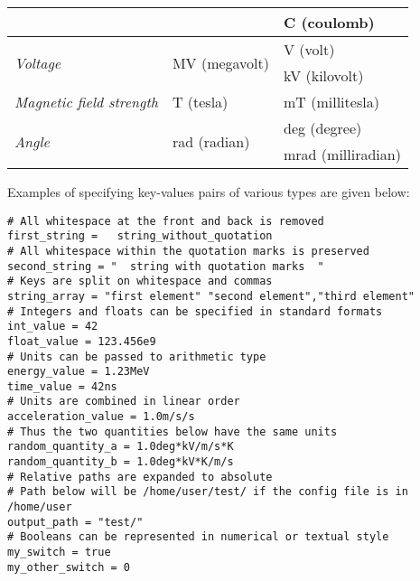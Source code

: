 \begin{table}[tbp]
\begin{tabular}{lll}
                                  &                                         & C (coulomb)              \\
\midrule
\multirow{2}{*}{\textit{Voltage}} & \multirow{2}{*}{MV (megavolt)}          & V (volt)                 \\
                                  &                                         & kV (kilovolt)            \\
\midrule
\textit{Magnetic field strength}  & T (tesla)                               & mT (millitesla)                 \\
\midrule
\multirow{2}{*}{\textit{Angle}}   & \multirow{2}{*}{rad (radian)}           & deg (degree)             \\
                                  &                                         & mrad (milliradian)       \\
\bottomrule
\end{tabular}
\end{table}

Examples of specifying key-values pairs of various types are given below:
\begin{verbatim}
# All whitespace at the front and back is removed
first_string =   string_without_quotation
# All whitespace within the quotation marks is preserved
second_string = "  string with quotation marks  "
# Keys are split on whitespace and commas
string_array = "first element" "second element","third element"
# Integers and floats can be specified in standard formats
int_value = 42
float_value = 123.456e9
# Units can be passed to arithmetic type
energy_value = 1.23MeV
time_value = 42ns
# Units are combined in linear order
acceleration_value = 1.0m/s/s
# Thus the two quantities below have the same units
random_quantity_a = 1.0deg*kV/m/s*K
random_quantity_b = 1.0deg*kV*K/m/s
# Relative paths are expanded to absolute
# Path below will be /home/user/test/ if the config file is in /home/user
output_path = "test/"
# Booleans can be represented in numerical or textual style
my_switch = true
my_other_switch = 0
\end{verbatim}

